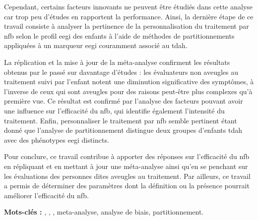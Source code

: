 {Cependant, certains facteurs innovants ne peuvent être étudiés dans cette analyse car trop peu d'études en rapportent la performance. 
Ainsi, la dernière étape de ce travail consiste à analyser la pertinence de la personnalisation du traitement par \gls{nfb} selon le profil 
\gls{eegi} des enfants à l'aide de méthodes de partitionnements appliquées à un marqueur \gls{eegi} couramment associé au \gls{tdah}. 

La réplication et la mise à jour de la méta-analyse confirment les résultats obtenus par le passé sur davantage d'études : 
les évaluateurs non aveugles au traitement suivi par l'enfant notent une diminution significative des symptômes, à l'inverse 
de ceux qui sont aveugles pour des raisons peut-être plus complexes qu'à première vue. Ce résultat est confirmé par l'analyse 
des facteurs pouvant avoir une influence sur l'efficacité du \gls{nfb}, qui identifie également l'intensité du traitement. Enfin, 
personnaliser le traitement par \gls{nfb} semble pertinent étant donné que l'analyse de partitionnement distingue deux groupes d'enfants 
\gls{tdah} avec des phénotypes \gls{eegi} distincts.

Pour conclure, ce travail contribue à apporter des réponses sur l'efficacité du \gls{nfb} en répliquant et en mettant à jour une méta-analyse 
ainsi qu'en se penchant sur les évaluations des personnes dites aveugles au traitement. Par ailleurs, ce travail a permis de déterminer des paramètres dont la définition ou la présence 
pourrait améliorer l'efficacité du \gls{nfb}.}
\vskip 0.3in
\noindent \large{\textbf{Mots-clés :}} , , , meta-analyse, analyse de biais, partitionnement.